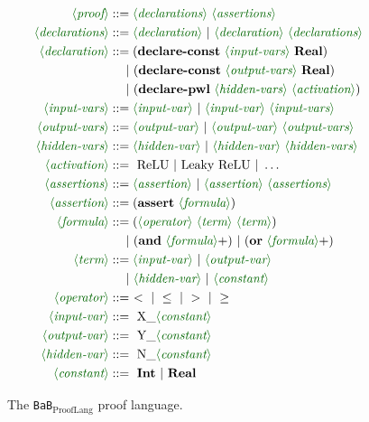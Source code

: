 \documentclass[oneside,11pt,dvipsnames]{book}
\newcommand{\prooflang}{\texttt{BaB$_{\text{ProofLang}}$}}
\begin{document}
\begin{figure}
{\small
\begin{align*}
    \lra{proof}         &::= \lra{declarations} \ \lra{assertions} \\
    \lra{declarations}  &::= \lra{declaration} \ | \ \lra{declaration} \ \lra{declarations} \\
    \lra{declaration}   &::= (\textbf{declare-const} \ \lra{input-vars} \ \textbf{Real}) \\
                        & \quad ~| \ (\textbf{declare-const} \ \lra{output-vars} \ \textbf{Real}) \\
                        & \quad ~| \ (\textbf{declare-pwl} \ \lra{hidden-vars} \ \lra{activation}) \\
    \lra{input-vars}    &::= \lra{input-var} \ | \ \lra{input-var} \ \lra{input-vars} \\
    \lra{output-vars}    &::= \lra{output-var} \ | \ \lra{output-var} \ \lra{output-vars} \\
    \lra{hidden-vars}    &::= \lra{hidden-var} \ | \ \lra{hidden-var} \ \lra{hidden-vars} \\
    \lra{activation}    &::= ~\text{ReLU} \ | \ \text{Leaky ReLU} \ | \ \ldots \\
    \lra{assertions}    &::= \lra{assertion} \ | \ \lra{assertion} \ \lra{assertions} \\
    \lra{assertion}     &::= (\textbf{assert} \ \lra{formula}) \\
    \lra{formula}       &::= (\lra{operator} \ \lra{term} \ \lra{term}) \\
                        & \quad ~| \ (\textbf{and} \ \lra{formula}+) \ | \ (\textbf{or} \ \lra{formula}+) \\
    \lra{term}          &::= \lra{input-var} \ | \ \lra{output-var} \\ 
                        & \quad ~| \ \lra{hidden-var} \ | \ \lra{constant} \\
    \lra{operator}      &::= ~ < \ | \ \leq \ | \ > \ | \ \geq \\
    \lra{input-var}     &::= ~\text{X\_}\lra{constant} \\
    \lra{output-var}    &::= ~\text{Y\_}\lra{constant} \\
    \lra{hidden-var}    &::= ~\text{N\_}\lra{constant} \\
    \lra{constant}      &::= ~\textbf{Int} \ | \ \textbf{Real}
\end{align*}
}
\caption{The \prooflang{} proof language.}\label{fig:grammar}
\end{figure}
\end{document}
